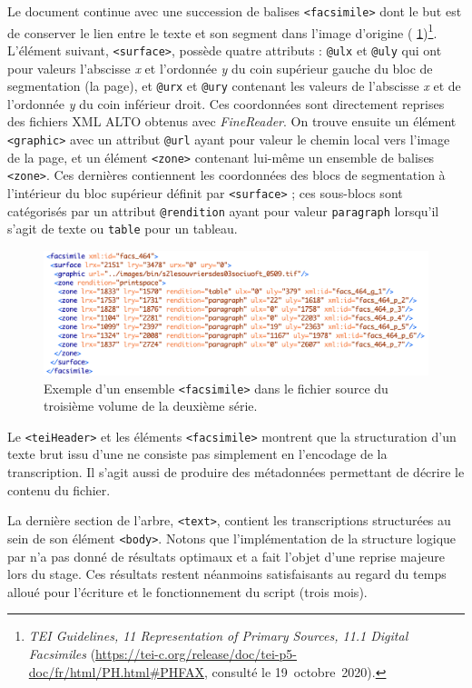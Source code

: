 Le document continue avec une succession de balises \texttt{<facsimile>} dont le but est de conserver le lien entre le texte et son segment dans l'image d'origine (\fig{} \ref{fig:facsimile})\footnote{\textit{TEI Guidelines, 11 Representation of Primary Sources, 11.1 Digital Facsimiles} (\url{https://tei-c.org/release/doc/tei-p5-doc/fr/html/PH.html\#PHFAX}, consulté le 19~octobre~2020).}. L'élément suivant, \texttt{<surface>}, possède quatre attributs : \texttt{@ulx} et \texttt{@uly} qui ont pour valeurs l'abscisse \textit{x} et l'ordonnée \textit{y} du coin supérieur gauche du bloc de segmentation (la page), et \texttt{@urx} et \texttt{@ury} contenant les valeurs de l'abscisse \textit{x} et de l'ordonnée \textit{y} du coin inférieur droit. Ces coordonnées sont directement reprises des fichiers XML ALTO obtenus avec \textit{FineReader}. On trouve ensuite un élément \texttt{<graphic>} avec un attribut \texttt{@url} ayant pour valeur le chemin local vers l'image de la page, et un élément \texttt{<zone>} contenant lui-même un ensemble de balises \texttt{<zone>}. Ces dernières contiennent les coordonnées des blocs de segmentation à l'intérieur du bloc supérieur définit par \texttt{<surface>} ; ces sous-blocs sont catégorisés par un attribut \texttt{@rendition} ayant pour valeur \texttt{paragraph} lorsqu'il s'agit de texte ou \texttt{table} pour un tableau.

\begin{figure}
    \centering
    \includegraphics[width=16cm]{img/facsimile.png}
    \caption[Exemple d'un ensemble \texttt{<facsimile>}]{Exemple d'un ensemble \texttt{<facsimile>} dans le fichier source du troisième volume de la deuxième série.}
    \label{fig:facsimile}
\end{figure}

Le \texttt{<teiHeader>} et les éléments \texttt{<facsimile>} montrent que la structuration d'un texte brut issu d'une \ocr{} ne consiste pas simplement en l'encodage de la transcription. Il s'agit aussi de produire des métadonnées permettant de décrire le contenu du fichier.

La dernière section de l'arbre, \texttt{<text>}, contient les transcriptions structurées au sein de son élément \texttt{<body>}. Notons que l'implémentation de la structure logique par \lse{} n'a pas donné de résultats optimaux et a fait l'objet d'une reprise majeure lors du stage. Ces résultats restent néanmoins satisfaisants au regard du temps alloué pour l'écriture et le fonctionnement du  script (trois mois). 

